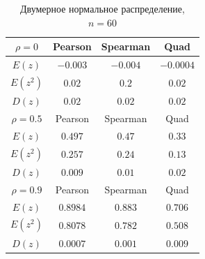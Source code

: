 \documentclass[a4]{article}
\begin{document}
\begin{table}[H]
	\caption{Двумерное нормальное распределение, $n=60$}
	\label{tab:my_label3}
	\begin{center}
		\vspace{5mm}
		\begin{tabular}{|c|c|c|c|}
			\hline
			$ \rho=0 $ & Pearson & Spearman & Quad\\
			\hline
			$ E(z) $ & $ -0.003 $ & $ -0.004 $ & $ -0.0004 $\\
			\hline
			$ E(z^{2}) $ & $ 0.02 $ & $ 0.2 $ & $ 0.02 $\\
			\hline
			$ D(z) $  & $ 0.02 $ & $ 0.02 $ & $ 0.02 $\\
			\hline
			$ \rho=0.5 $ & Pearson & Spearman & Quad\\
			\hline
			$ E(z) $ & $ 0.497 $ & $ 0.47 $ & $ 0.33 $\\
			\hline
			$ E(z^{2}) $ & $ 0.257 $ & $ 0.24 $ & $ 0.13 $\\
			\hline
			$ D(z) $  & $ 0.009 $ & $ 0.01 $ & $ 0.02 $ \\
			\hline
			$ \rho=0.9 $ & Pearson & Spearman & Quad\\
			\hline
			$ E(z) $ & $ 0.8984 $ & $ 0.883 $ & $ 0.706 $\\
			\hline
			$ E(z^{2}) $ & $ 0.8078 $ & $ 0.782 $ & $ 0.508 $\\
			\hline
			$ D(z) $  & $ 0.0007 $ & $ 0.001 $ & $ 0.009 $ \\
			\hline
		\end{tabular}
	\end{center}
\end{table}
\end{document}
